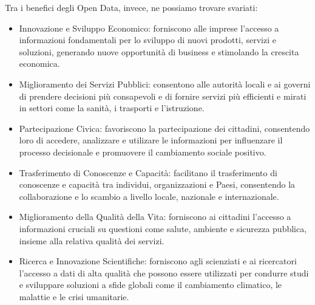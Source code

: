 Tra i benefici degli Open Data, invece, ne possiamo trovare svariati:
\begin{itemize}
    \item Innovazione e Sviluppo Economico: forniscono alle imprese l'accesso a informazioni fondamentali per lo sviluppo di nuovi prodotti, servizi e soluzioni, generando nuove opportunità di business e stimolando la crescita economica.
    \item Miglioramento dei Servizi Pubblici: consentono alle autorità locali e ai governi di prendere decisioni più consapevoli e di fornire servizi più efficienti e mirati in settori come la sanità, i trasporti e l'istruzione.
    \item Partecipazione Civica: favoriscono la partecipazione dei cittadini, consentendo loro di accedere, analizzare e utilizare le informazioni per influenzare il processo decisionale e promuovere il cambiamento sociale positivo.
    \item Trasferimento di Conoscenze e Capacità: facilitano il trasferimento di conoscenze e capacità tra individui, organizzazioni e Paesi, consentendo la collaborazione e lo scambio a livello locale, nazionale e internazionale.
    \item Miglioramento della Qualità della Vita: forniscono ai cittadini l'accesso a informazioni cruciali su questioni come salute, ambiente e sicurezza pubblica, insieme alla relativa qualità dei servizi.
    \item Ricerca e Innovazione Scientifiche: forniscono agli scienziati e ai ricercatori l'accesso a dati di alta qualità che possono essere utilizzati per condurre studi e sviluppare soluzioni a sfide globali come il cambiamento climatico, le malattie e le crisi umanitarie.
\end{itemize}




